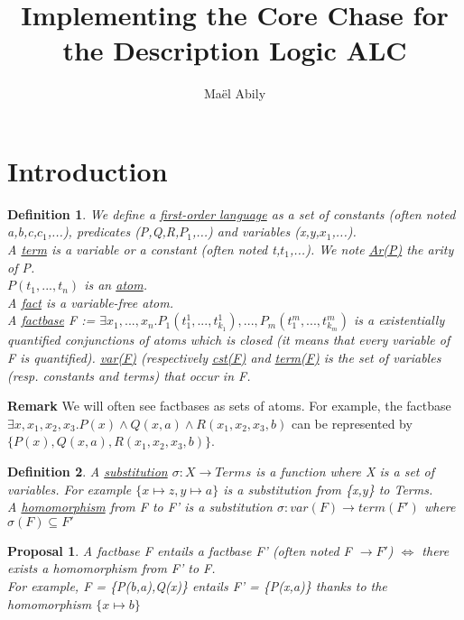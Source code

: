\documentclass{article}
\title{Implementing the Core Chase for the Description Logic ALC}
\author{Maël Abily}	%
\newtheorem{pro}{Proposal}
\newtheorem{defi}{Definition}
\begin{document}
\maketitle						%




\section{Introduction}

\begin{defi} We define a \underline{first-order language} as a set of constants (often noted a,b,c,$c_{1}$,...), predicates (P,Q,R,$P_{1}$,...) and variables (x,y,$x_{1}$,...). \\
A \underline{term} is a variable or a constant (often noted t,$t_{1}$,...).
We note \underline{Ar(P)} the arity of P. \\
$P(t_{1},...,t_{n})$ is an \underline{atom}. \\
A \underline{fact} is a variable-free atom. \\
A \underline{factbase} F := $\exists x_{1},...,x_{n}.P_{1}(t_{1}^{1},...,t_{k_{1}}^{1}),...,P_{m}(t_{1}^{m},...,t_{k_{m}}^{m})$ is a existentially quantified conjunctions of atoms which is closed (it means that every variable of F is quantified). \underline{var(F)} (respectively \underline{cst(F)} and \underline{term(F)} is the set of variables (resp. constants and terms) that occur in F.
\end{defi}

\textbf{Remark} We will often see factbases as sets of atoms. For example, the factbase $\exists x,x_{1},x_{2},x_{3}. P(x) \land Q(x,a) \land R(x_{1},x_{2},x_{3},b)$ can be represented by $\{P(x),Q(x,a),R(x_{1},x_{2},x_{3},b)\}$.

\begin{defi}
A \underline{substitution} $\sigma:X \to Terms$ is a function where X is a set of variables. For example $\{x \mapsto z, y \mapsto a \}$ is a substitution from \{x,y\} to Terms. \\
A \underline{homomorphism} from F to F' is a substitution $\sigma:var(F) \to term(F')$ where $\sigma(F) \subseteq F'$
\end{defi}
\begin{pro}
A factbase F entails a factbase F' (often noted F $\to F'$) $\Leftrightarrow$ there exists a homomorphism from F' to F. \\
For example, F = \{P(b,a),Q(x)\} entails F' = \{P(x,a)\} thanks to the homomorphism $\{x \mapsto b\}$ 
\end{pro}
\end{document}
